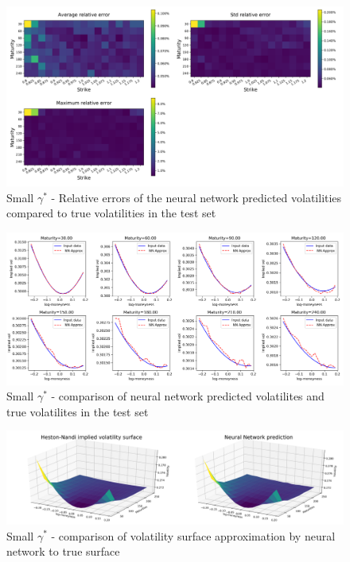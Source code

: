 \documentclass{article}
\begin{document}
\begin{figure}[!ht]
\centering
\includegraphics[width=\textwidth]{Small_g_Vola_HNG_NNErrors.png}
\caption{Small $\gamma^*$ - Relative errors of the neural network predicted volatilities compared to true volatilities in the test set}
\label{fig:Small_g_NN_rel_err}
\end{figure}
\begin{figure}[!ht]
\centering
\includegraphics[width=\textwidth]{Small_g_Vola_HNG_smile.png}
\caption{Small $\gamma^*$ - comparison of neural network predicted volatilites and true volatilites in the test set}
\label{fig:Small_g_smile}
\end{figure}
\begin{figure}[!ht]
\centering
\includegraphics[width=\textwidth]{Small_g_Vola_surface.png}
\caption{Small $\gamma^*$ - comparison of volatility surface approximation by neural network to true surface}
\label{fig:Small_g_vola_surface}
\end{figure}
\end{document}
